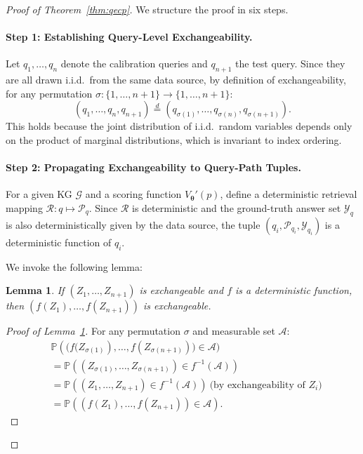 \documentclass{article}
\theoremstyle{plain}
\newtheorem{lemma}[theorem]{Lemma}
\theoremstyle{definition}
\theoremstyle{remark}
\begin{document}
\begin{proof}[Proof of Theorem~\ref{thm:qecp}]
We structure the proof in six steps.

\paragraph{Step 1: Establishing Query-Level Exchangeability.}
Let $q_1, \ldots, q_n$ denote the calibration queries and $q_{n+1}$ the test query. Since they are all drawn i.i.d.\ from the same data source, by definition of exchangeability, for any permutation $\sigma: \{1,\ldots,n+1\} \to \{1,\ldots,n+1\}$:
\[
(q_1, \ldots, q_n, q_{n+1}) \stackrel{d}{=} (q_{\sigma(1)}, \ldots, q_{\sigma(n)}, q_{\sigma(n+1)}).
\]
This holds because the joint distribution of i.i.d.\ random variables depends only on the product of marginal distributions, which is invariant to index ordering.

\paragraph{Step 2: Propagating Exchangeability to Query-Path Tuples.}
For a given KG $\mathcal{G}$ and a scoring function $V_{\bm\theta}'(p)$, define a deterministic retrieval mapping $\mathcal{R}: q \mapsto \mathcal{P}_q$. Since $\mathcal{R}$ is deterministic and the ground-truth answer set $\mathcal{Y}_q$ is also deterministically given by the data source, the tuple $(q_i, \mathcal{P}_{q_i}, \mathcal{Y}_{q_i})$ is a deterministic function of $q_i$.

We invoke the following lemma:
\begin{lemma}
\label{lem:deterministic}
If $(Z_1, \ldots, Z_{n+1})$ is exchangeable and $f$ is a deterministic function, then $(f(Z_1), \ldots, f(Z_{n+1}))$ is exchangeable.
\end{lemma}

\begin{proof}[Proof of Lemma~\ref{lem:deterministic}]
For any permutation $\sigma$ and measurable set $\mathcal{A}$:
\begin{align*}
&\mathbb{P}\left((f(Z_{\sigma(1)}\right), \ldots, f(Z_{\sigma(n+1)})) \in \mathcal{A}) \\
&= \mathbb{P}((Z_{\sigma(1)}, \ldots, Z_{\sigma(n+1)}) \in f^{-1}(\mathcal{A})) \\
&= \mathbb{P}((Z_1, \ldots, Z_{n+1}) \in f^{-1}(\mathcal{A})) \ \text{(by exchangeability of } Z_i\text{)} \\
&= \mathbb{P}((f(Z_1), \ldots, f(Z_{n+1})) \in \mathcal{A}).
\end{align*}
\end{proof}


\end{proof}
\end{document}
